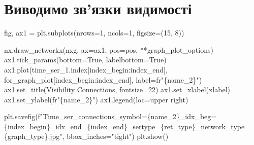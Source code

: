 \documentclass[
  letterpaper,
]{report}
\newenvironment{Shaded}{\begin{snugshade}}{\end{snugshade}}
\newcommand{\DecValTok}[1]{\textcolor[rgb]{0.68,0.00,0.00}{#1}}
\newcommand{\NormalTok}[1]{\textcolor[rgb]{0.00,0.23,0.31}{#1}}
\newcommand{\OperatorTok}[1]{\textcolor[rgb]{0.37,0.37,0.37}{#1}}
\newcommand{\SpecialCharTok}[1]{\textcolor[rgb]{0.37,0.37,0.37}{#1}}
\newcommand{\SpecialStringTok}[1]{\textcolor[rgb]{0.13,0.47,0.30}{#1}}
\newcommand{\StringTok}[1]{\textcolor[rgb]{0.13,0.47,0.30}{#1}}
\newcommand{\VariableTok}[1]{\textcolor[rgb]{0.07,0.07,0.07}{#1}}
\newcommand{\VerbatimStringTok}[1]{\textcolor[rgb]{0.13,0.47,0.30}{#1}}
\begin{document}
\hypertarget{ux432ux438ux432ux43eux434ux438ux43cux43e-ux437ux432ux44fux437ux43aux438-ux432ux438ux434ux438ux43cux43eux441ux442ux456}{%
\section{Виводимо зв'язки
видимості}\label{ux432ux438ux432ux43eux434ux438ux43cux43e-ux437ux432ux44fux437ux43aux438-ux432ux438ux434ux438ux43cux43eux441ux442ux456}}

\begin{Shaded}
\begin{Highlighting}[]
\NormalTok{fig, ax1 }\OperatorTok{=}\NormalTok{ plt.subplots(nrows}\OperatorTok{=}\DecValTok{1}\NormalTok{, ncols}\OperatorTok{=}\DecValTok{1}\NormalTok{, figsize}\OperatorTok{=}\NormalTok{(}\DecValTok{15}\NormalTok{, }\DecValTok{8}\NormalTok{))}

\NormalTok{nx.draw\_networkx(nxg, ax}\OperatorTok{=}\NormalTok{ax1, pos}\OperatorTok{=}\NormalTok{pos, }\OperatorTok{**}\NormalTok{graph\_plot\_options)}
\NormalTok{ax1.tick\_params(bottom}\OperatorTok{=}\VariableTok{True}\NormalTok{, labelbottom}\OperatorTok{=}\VariableTok{True}\NormalTok{)}
\NormalTok{ax1.plot(time\_ser\_1.index[index\_begin:index\_end], for\_graph\_plot[index\_begin:index\_end], label}\OperatorTok{=}\VerbatimStringTok{fr"}\SpecialCharTok{\{}\NormalTok{name\_2}\SpecialCharTok{\}}\VerbatimStringTok{"}\NormalTok{)}
\NormalTok{ax1.set\_title(}\StringTok{\textquotesingle{}Visibility Connections\textquotesingle{}}\NormalTok{, fontsize}\OperatorTok{=}\DecValTok{22}\NormalTok{)}
\NormalTok{ax1.set\_xlabel(xlabel)}
\NormalTok{ax1.set\_ylabel(}\VerbatimStringTok{fr"}\SpecialCharTok{\{}\NormalTok{name\_2}\SpecialCharTok{\}}\VerbatimStringTok{"}\NormalTok{)}
\NormalTok{ax1.legend(loc}\OperatorTok{=}\StringTok{\textquotesingle{}upper right\textquotesingle{}}\NormalTok{)}

\NormalTok{plt.savefig(}\SpecialStringTok{f"Time\_ser\_connections\_symbol=}\SpecialCharTok{\{}\NormalTok{name\_2}\SpecialCharTok{\}}\SpecialStringTok{\_idx\_beg=}\SpecialCharTok{\{}\NormalTok{index\_begin}\SpecialCharTok{\}}\SpecialStringTok{\_idx\_end=}\SpecialCharTok{\{}\NormalTok{index\_end}\SpecialCharTok{\}}\SpecialStringTok{\_sertype=}\SpecialCharTok{\{}\NormalTok{ret\_type}\SpecialCharTok{\}}\SpecialStringTok{\_network\_type=}\SpecialCharTok{\{}\NormalTok{graph\_type}\SpecialCharTok{\}}\SpecialStringTok{.jpg"}\NormalTok{, bbox\_inches}\OperatorTok{=}\StringTok{"tight"}\NormalTok{)}
\NormalTok{plt.show()}
\end{Highlighting}
\end{Shaded}
\end{document}
